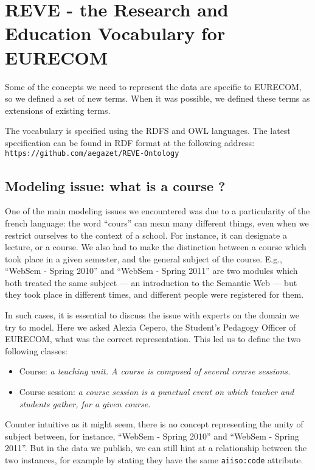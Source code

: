 \documentclass[a4paper,11pt]{report}
\begin{document}
\section{REVE - the Research and Education Vocabulary for EURECOM}
Some of the concepts we need to represent the data are specific to EURECOM, so we defined a set of new terms. When it was possible, we defined these terms as extensions of existing terms. 

The vocabulary is specified using the RDFS and OWL languages. The latest specification can be found in RDF format at the following address: \texttt{https://github.com/aegazet/REVE-Ontology}

\subsection{Modeling issue: what is a course ?} %
One of the main modeling issues we encountered was due to a particularity of the french language: the word ``cours'' can mean many different things, even when we restrict ourselves to the context of a school. For instance, it can designate a lecture, or a course. We also had to make the distinction between a course which took place in a given semester, and the general subject of the course. E.g., ``WebSem - Spring 2010'' and ``WebSem - Spring 2011'' are two modules which both treated the same subject --- an introduction to the Semantic Web --- but they took place in different times, and different people were registered for them. 

In such cases, it is essential to discuss the issue with experts on the domain we try to model. Here we asked Alexia Cepero, the Student's Pedagogy Officer of EURECOM, what was the correct representation. This led us to define the two following classes:
\begin{itemize}
\item Course: \emph{a teaching unit. A course is composed of several course sessions.}
\item Course session: \emph{a course session is a punctual event on which teacher and students gather, for a given course.}
\end{itemize}
Counter intuitive as it might seem, there is no concept representing the unity of subject between, for instance, ``WebSem - Spring 2010'' and ``WebSem - Spring 2011''. But in the data we publish, we can still hint at a relationship between the two instances, for example by stating they have the same \texttt{aiiso:code} attribute. 
\end{document}
